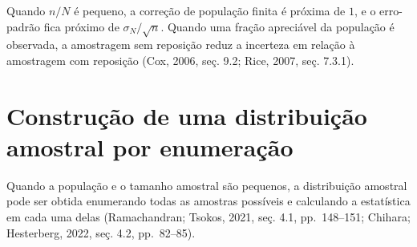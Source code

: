 \documentclass[
  letterpaper,
  DIV=11,
  numbers=noendperiod]{scrreprt}
\begin{document}
\begin{tcolorbox}[enhanced jigsaw, colback=white, leftrule=.75mm, colbacktitle=quarto-callout-note-color!10!white, breakable, titlerule=0mm, bottomtitle=1mm, title=\textcolor{quarto-callout-note-color}{\faInfo}\hspace{0.5em}{Interpretação --- Fração amostral}, colframe=quarto-callout-note-color-frame, toprule=.15mm, opacityback=0, bottomrule=.15mm, opacitybacktitle=0.6, arc=.35mm, toptitle=1mm, rightrule=.15mm, coltitle=black, left=2mm]

Quando \(n/N\) é pequeno, a correção de população finita é próxima de
\(1\), e o erro-padrão fica próximo de \(\sigma_N/\sqrt{n}\). Quando uma
fração apreciável da população é observada, a amostragem sem reposição
reduz a incerteza em relação à amostragem com reposição (Cox, 2006, seç.
9.2; Rice, 2007, seç. 7.3.1).

\end{tcolorbox}

\section{Construção de uma distribuição amostral por
enumeração}\label{construuxe7uxe3o-de-uma-distribuiuxe7uxe3o-amostral-por-enumerauxe7uxe3o}

Quando a população e o tamanho amostral são pequenos, a distribuição
amostral pode ser obtida enumerando todas as amostras possíveis e
calculando a estatística em cada uma delas (Ramachandran; Tsokos, 2021,
seç. 4.1, pp.~148--151; Chihara; Hesterberg, 2022, seç. 4.2,
pp.~82--85).
\end{document}
